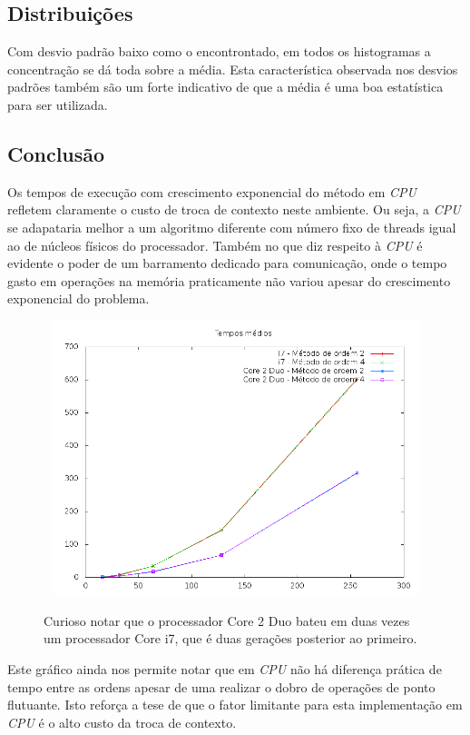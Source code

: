   \subsection{Distribuições}
    Com desvio padrão baixo como o encontrontado, em todos os histogramas a concentração se dá toda sobre a média. Esta característica observada nos desvios padrões também são um forte indicativo de que a média é uma boa estatística para ser utilizada.    
  
  \subsection{Conclusão}
  Os tempos de execução com crescimento exponencial do método em \textit{CPU} refletem claramente o custo de troca de contexto neste ambiente. Ou seja, a \textit{CPU} se adapataria melhor a um algoritmo diferente com número fixo de threads igual ao de núcleos físicos do processador. Também no que diz respeito à \textit{CPU} é evidente o poder de um barramento dedicado para comunicação, onde o tempo gasto em operações na memória praticamente não variou apesar do crescimento exponencial do problema.
  
  \begin{figure}[!h]
    \begin{center}
       \includegraphics[width=120mm, height=80mm]{images/cpu-means.png}
       \label{fig:cpu-means}
       \caption{Curioso notar que o processador Core 2 Duo bateu em duas vezes um processador Core i7, que é duas gerações posterior ao primeiro.}
    \end{center}
  \end{figure}
  
  Este gráfico ainda nos permite notar que em \textit{CPU} não há diferença prática de tempo entre as ordens apesar de uma realizar o dobro de operações de ponto flutuante. Isto reforça a tese de que o fator limitante para esta implementação em \textit{CPU} é o alto custo da troca de contexto.
  
